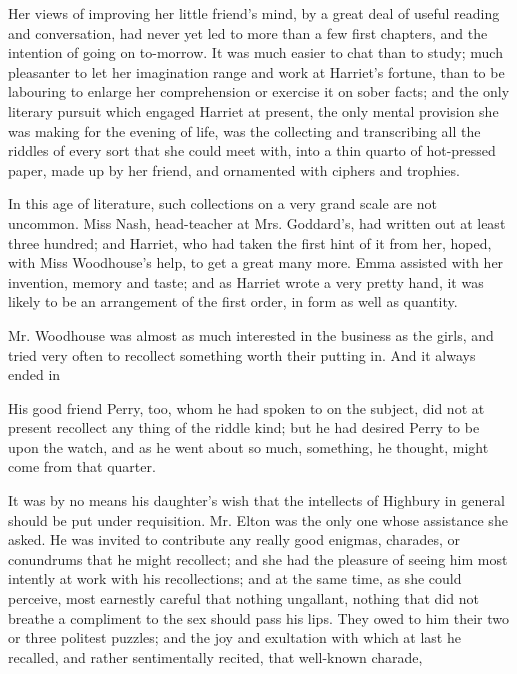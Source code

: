 Her views of improving her little friend's mind, by a great deal of useful reading and conversation, had never yet led to more than a few first chapters, and the intention of going on to-morrow. It was much easier to chat than to study; much pleasanter to let her imagination range and work at Harriet's fortune, than to be labouring to enlarge her comprehension or exercise it on sober facts; and the only literary pursuit which engaged Harriet at present, the only mental provision she was making for the evening of life, was the collecting and transcribing all the riddles of every sort that she could meet with, into a thin quarto of hot-pressed paper, made up by her friend, and ornamented with ciphers and trophies.

In this age of literature, such collections on a very grand scale are not uncommon. Miss Nash, head-teacher at Mrs. Goddard's, had written out at least three hundred; and Harriet, who had taken the first hint of it from her, hoped, with Miss Woodhouse's help, to get a great many more. Emma assisted with her invention, memory and taste; and as Harriet wrote a very pretty hand, it was likely to be an arrangement of the first order, in form as well as quantity.

Mr. Woodhouse was almost as much interested in the business as the girls, and tried very often to recollect something worth their putting in.  And it always ended in 

His good friend Perry, too, whom he had spoken to on the subject, did not at present recollect any thing of the riddle kind; but he had desired Perry to be upon the watch, and as he went about so much, something, he thought, might come from that quarter.

It was by no means his daughter's wish that the intellects of Highbury in general should be put under requisition. Mr. Elton was the only one whose assistance she asked. He was invited to contribute any really good enigmas, charades, or conundrums that he might recollect; and she had the pleasure of seeing him most intently at work with his recollections; and at the same time, as she could perceive, most earnestly careful that nothing ungallant, nothing that did not breathe a compliment to the sex should pass his lips. They owed to him their two or three politest puzzles; and the joy and exultation with which at last he recalled, and rather sentimentally recited, that well-known charade,

